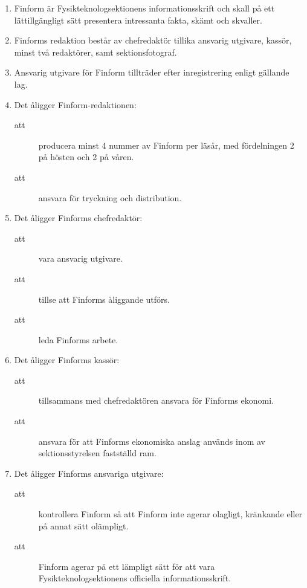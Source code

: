 \documentclass[11pt,a4paper]{article}
\begin{document}
\begin{enumerate}[\thesubsection .1]

  \item Finform är Fysikteknologsektionens informationsskrift och
  skall på ett lättillgängligt sätt presentera intressanta fakta,
  skämt och skvall\-er. 

  \item Finforms redaktion består av chefredaktör tillika ansvarig utgivare, kassör, minst två
  redak\-tör\-er, samt sektionsfotograf.

  \item Ansvarig utgivare för Finform tillträder efter
  inregistrering enligt gällande lag.

  \item Det åligger Finform-redaktionen:
    \begin{description}
      \item[att] producera minst 4 nummer av Finform per läsår, med för\-del\-ningen 2 på hösten och 2 på våren.
      \item[att] ansvara för tryckning och distribution.

    \end{description}

  \item Det åligger Finforms chefredaktör:
    \begin{description}
       \item[att] vara ansvarig utgivare.
      \item[att] tillse att Finforms åliggande  utförs.
      \item[att] leda Finforms arbete.
    \end{description}


  \item Det åligger Finforms kassör:
    \begin{description}
      \item[att] tillsammans med chefredaktören ansvara för Finforms ekonomi.
      \item[att] ansvara för att Finforms ekonomiska anslag används inom av sektionsstyrelsen fastställd ram.
    \end{description}


  \item Det åligger Finforms ansvariga utgivare:
    \begin{description}
      \item[att] kontrollera Finform så att Finform inte agerar olagligt, krän\-kan\-de eller på annat sätt olämpligt.
      \item[att] Finform agerar på ett lämpligt sätt för att vara Fysikteknolog\-sek\-tionens officiella informationsskrift.
    \end{description}

\end{enumerate}
\end{document}
